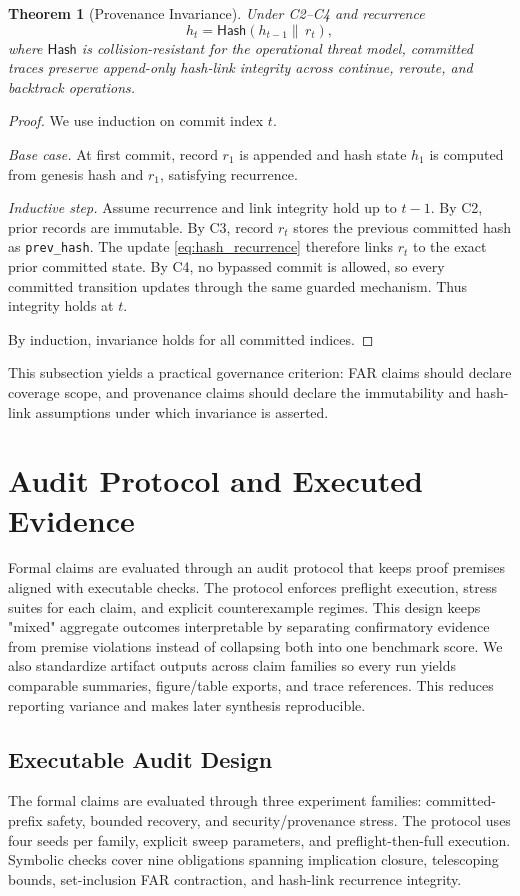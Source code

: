 \documentclass{article} %
\newtheorem{theorem}{Theorem}[section]
\begin{document}
\begin{theorem}[Provenance Invariance]
\label{thm:provenance}
Under C2--C4 and recurrence
\begin{equation}
h_t = \mathsf{Hash}(h_{t-1} \|\, r_t),
\label{eq:hash_recurrence}
\end{equation}
where $\mathsf{Hash}$ is collision-resistant for the operational threat model, committed traces preserve append-only hash-link integrity across continue, reroute, and backtrack operations.
\end{theorem}
\begin{proof}
We use induction on commit index $t$.

\textit{Base case.} At first commit, record $r_1$ is appended and hash state $h_1$ is computed from genesis hash and $r_1$, satisfying recurrence.

\textit{Inductive step.} Assume recurrence and link integrity hold up to $t-1$. By C2, prior records are immutable. By C3, record $r_t$ stores the previous committed hash as \texttt{prev\_hash}. The update \eqref{eq:hash_recurrence} therefore links $r_t$ to the exact prior committed state. By C4, no bypassed commit is allowed, so every committed transition updates through the same guarded mechanism. Thus integrity holds at $t$.

By induction, invariance holds for all committed indices.\qedhere
\end{proof}
This subsection yields a practical governance criterion: FAR claims should declare coverage scope, and provenance claims should declare the immutability and hash-link assumptions under which invariance is asserted.

\section{Audit Protocol and Executed Evidence}
\label{sec:protocol}
Formal claims are evaluated through an audit protocol that keeps proof premises aligned with executable checks. The protocol enforces preflight execution, stress suites for each claim, and explicit counterexample regimes. This design keeps "mixed" aggregate outcomes interpretable by separating confirmatory evidence from premise violations instead of collapsing both into one benchmark score.
We also standardize artifact outputs across claim families so every run yields comparable summaries, figure/table exports, and trace references. This reduces reporting variance and makes later synthesis reproducible.

\subsection{Executable Audit Design}
The formal claims are evaluated through three experiment families: committed-prefix safety, bounded recovery, and security/provenance stress. The protocol uses four seeds per family, explicit sweep parameters, and preflight-then-full execution. Symbolic checks cover nine obligations spanning implication closure, telescoping bounds, set-inclusion FAR contraction, and hash-link recurrence integrity.
\end{document}
